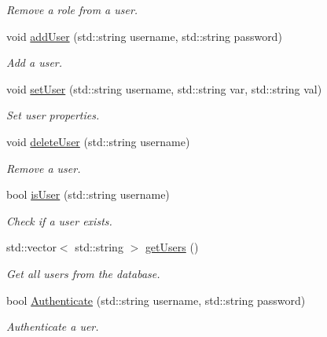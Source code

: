 \begin{DoxyCompactItemize}
\begin{DoxyCompactList}\small\item\em Remove a role from a user. \end{DoxyCompactList}\item 
\hypertarget{classSecurityManager_ac9dc2c5a7667b95d9850ff22fc897213}{void \hyperlink{classSecurityManager_ac9dc2c5a7667b95d9850ff22fc897213}{add\-User} (std\-::string username, std\-::string password)}\label{classSecurityManager_ac9dc2c5a7667b95d9850ff22fc897213}

\begin{DoxyCompactList}\small\item\em Add a user. \end{DoxyCompactList}\item 
\hypertarget{classSecurityManager_ad616d32abdd366d50dfd01091d6a1f0c}{void \hyperlink{classSecurityManager_ad616d32abdd366d50dfd01091d6a1f0c}{set\-User} (std\-::string username, std\-::string var, std\-::string val)}\label{classSecurityManager_ad616d32abdd366d50dfd01091d6a1f0c}

\begin{DoxyCompactList}\small\item\em Set user properties. \end{DoxyCompactList}\item 
\hypertarget{classSecurityManager_a61db3bbbb21105c441d2a7bc75fb41bd}{void \hyperlink{classSecurityManager_a61db3bbbb21105c441d2a7bc75fb41bd}{delete\-User} (std\-::string username)}\label{classSecurityManager_a61db3bbbb21105c441d2a7bc75fb41bd}

\begin{DoxyCompactList}\small\item\em Remove a user. \end{DoxyCompactList}\item 
bool \hyperlink{classSecurityManager_abda859f83e39977a46ce993970a35f92}{is\-User} (std\-::string username)
\begin{DoxyCompactList}\small\item\em Check if a user exists. \end{DoxyCompactList}\item 
std\-::vector$<$ std\-::string $>$ \hyperlink{classSecurityManager_a05f3c7fc498871277a00dffa092614c1}{get\-Users} ()
\begin{DoxyCompactList}\small\item\em Get all users from the database. \end{DoxyCompactList}\item 
bool \hyperlink{classSecurityManager_ace68188567f645c18097b8791db64b41}{Authenticate} (std\-::string username, std\-::string password)
\begin{DoxyCompactList}\small\item\em Authenticate a uer. \end{DoxyCompactList}\end{DoxyCompactItemize}


